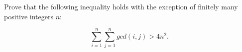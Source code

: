 Prove that the following inequality holds with the exception of finitely many positive integers $n$:

\[\sum_{i=1}^n\sum_{j=1}^n gcd(i,j)>4n^2.\]